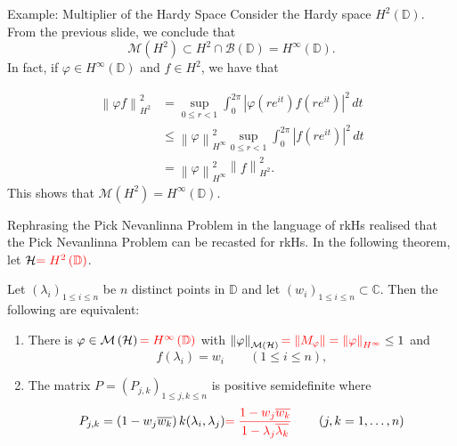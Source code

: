 \documentclass[handout]{beamer}
\newcommand{\C}{\mathbb C}
\newcommand{\D}{\mathbb D}
\newcommand{\calB}{{\mathcal B}}
\newcommand{\calH}{{\mathcal H}}
\newcommand{\calM}{{\mathcal M}}
\newcommand{\norm}[1]{\left\lVert #1 \right\rVert}
\newcommand{\abs}[1]{\left\lvert #1 \right\rvert}
\begin{document}
\begin{frame}{Example: Multiplier of the Hardy Space}
Consider the Hardy space $H^{2} \left( \D \right)$. From the previous slide, we conclude that 
\begin{equation*}
\calM \left( H^{2} \right) \subset H^{2} \cap \calB \left( \D \right) = H^{\infty} \left( \D \right).
\end{equation*}
\pause
In fact, if $\varphi \in H^{\infty} \left( \D \right)$ and $f \in H^{2}$, we have that 

\begin{align*}
\norm{\varphi f}_{H^{2}}^{2} &= \sup_{0\le r < 1} \int_{0}^{2\pi} \abs{\varphi \left( re^{it} \right) f \left( re^{it} \right)}^{2} \, dt \\
&\le \norm{\varphi}_{H^{\infty}}^{2} \sup_{0 \le r < 1} \int_{0}^{2\pi} \abs{f\left( re^{it} \right)}^{2} \, dt \\
&= \norm{\varphi}_{H^{\infty}}^{2} \norm{f}_{H^{2}}^{2}.
\end{align*}
This shows that $\calM \left( H^{2} \right) = H^{\infty} \left( \D \right)$.
\end{frame}

\begin{frame}{Rephrasing the Pick Nevanlinna Problem in the language of rkHs}
\citeauthor{1cb1f5bb-aa4a-31e2-ba77-0159c6d327f4} \cite{1cb1f5bb-aa4a-31e2-ba77-0159c6d327f4} realised that the Pick Nevanlinna Problem can be recasted for rkHs. In the following theorem, let $\calH \textcolor{red}{= H^{2} \left( \D \right)}$.
\begin{theorem}
Let $\left( \lambda_{i} \right)_{1\le i \le n}$ be $n$ distinct points in $\D$ and let $\left( w_{i} \right)_{1 \le i \le n} \subset \C$. Then the following are equivalent:
\begin{enumerate}
\item There is $\varphi \in \calM \left( \calH \right) \textcolor{red}{= H^{\infty} \left( \D \right)}$ with $\norm{\varphi}_{\calM \left( \calH \right)} \textcolor{red}{=\norm{M_{\varphi}} = \norm{\varphi}_{H^{\infty}}}\le 1$ and 
\begin{equation*}
f\left( \lambda_{i} \right) = w_{i} \qquad \left( 1 \le i \le n \right),
\end{equation*}
\item The matrix $P = \left( P_{j,k} \right)_{1 \le j,k \le n}$ is positive semidefinite where
\begin{equation*}
P_{j,k} = \left( 1-w_{j}\overline{w_{k}} \right) k(\lambda_{i}, \lambda_{j})  \textcolor{red}{=\frac{1-w_{j} \overline{w_{k}}}{1-\lambda_{j}\overline{\lambda_{k}}}} \qquad \left( j,k = 1, \ldots , n \right)
\end{equation*}
\end{enumerate}
\end{theorem}
\end{frame}
\end{document}
